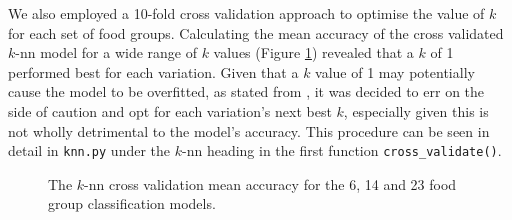 \documentclass[11pt]{article}
\begin{document}
We also employed a 10-fold cross validation approach to optimise the value of $k$ for each set of food groups. Calculating the mean accuracy of the cross validated $k$-nn model for a wide range of $k$ values (Figure \ref{fig:knn-cross-validation}) revealed that a $k$ of 1 performed best for each variation. Given that a $k$ value of 1 may potentially cause the model to be overfitted, as stated from \cite{StackExchangePost}, it was decided to err on the side of caution and opt for each variation's next best $k$, especially given this is not wholly detrimental to the model's accuracy. This procedure can be seen in detail in \verb|knn.py| under the $k$-nn heading in the first function \verb|cross_validate()|.

\begin{figure}[htbp]
    \centering
    \qquad
    \qquad
    \caption{The $k$-nn cross validation mean accuracy for the 6, 14 and 23 food group classification models.}
    \label{fig:knn-cross-validation}
\end{figure}
\end{document}
